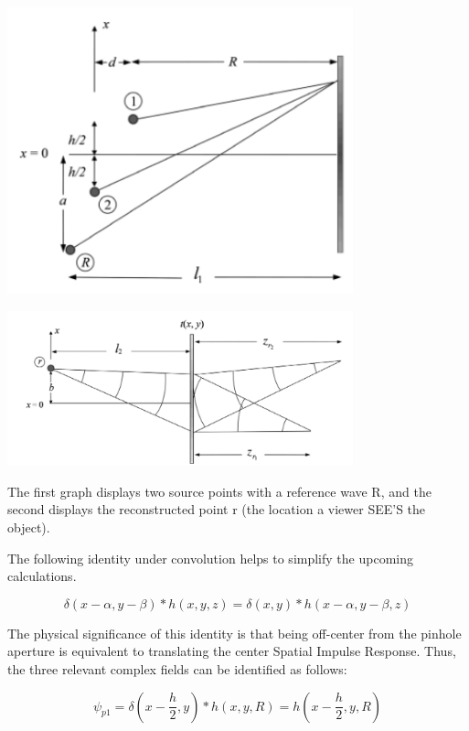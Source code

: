 \documentclass[12pt]{article}
\begin{document}
\begin{center}
\includegraphics[width=100mm]{tupac11.png}
\end{center}

\begin{center}
\includegraphics[width=100mm]{tupac12.png}
\end{center}

The first graph displays two source points with a reference wave R, and the second displays the reconstructed point r (the location a viewer SEE'S the object).

The following identity under convolution helps to simplify the upcoming calculations.

\begin{equation}
	\delta(x - \alpha,y - \beta)*h(x,y,z) = \delta(x,y)*h(x - \alpha,y - \beta,z)
\end{equation}

The physical significance of this identity is that being off-center from the pinhole aperture is equivalent to translating the center Spatial Impulse Response. Thus, the three relevant complex fields can be identified as follows:

\begin{equation}
	\psi_{p1} = \delta(x - \frac{h}{2},y)*h(x,y,R) = h(x - \frac{h}{2},y,R)
\end{equation}
\end{document}
